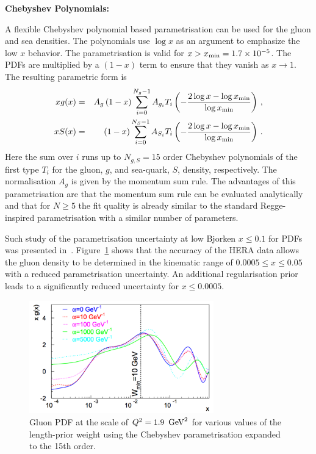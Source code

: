 \begin{description}
\item \bf {Chebyshev Polynomials:} \rm

A flexible Chebyshev polynomial based parametrisation can be used for the gluon and sea densities. The polynomials
use $\log x$ as an argument to emphasize the low $x$ behavior. 
The parametrisation is valid for $x>x_{\rm min} = 1.7\times 10^{-5}$. The PDFs are multiplied
by a $(1-x)$ term to ensure that they vanish as $x\to 1$. The resulting parametric form is 
\begin{eqnarray}
x g(x) &=& A_g \left(1-x\right) \sum_{i=0}^{N_g-1} A_{g_i} T_i \left(-\frac{\textstyle 2\log x - \log x_{\rm min} } {\textstyle \log x_{\rm min} } \right)\,, \label{eq:glu} \\
x S(x) &=& \left(1-x\right) \sum_{i=0}^{N_S-1} A_{S_i} T_i \left(-\frac{\textstyle 2\log x - \log x_{\rm min} } {\textstyle \log x_{\rm min} } \right)\,. \label{eq:sea} 
\end{eqnarray}
Here the sum over $i$ runs up to $N_{g,S}=15$ order Chebyshev polynomials of the first type $T_i$ for
the gluon, $g$, and sea-quark, $S$, density, respectively. 
The normalisation $A_g$ is given by the momentum sum rule.
%
The advantages of this parametrisation are that the momentum sum rule can be evaluated analytically 
and that for $N \ge 5$ the fit quality is already similar
to the standard Regge-inspired parametrisation with a similar number of parameters.

Such study of the parametrisation uncertainty at low Bjorken $x \le 0.1$ for PDFs was presented 
in~\cite{Chebyshev}. Figure~\ref{fig:cheb} shows that the accuracy of 
the HERA data allows the gluon density to be  determined in the kinematic range of $0.0005 \le x \le 0.05$ 
with a reduced parametrisation uncertainty. An additional regularisation prior leads to a 
significantly reduced uncertainty for $x \le 0.0005$.
\begin{figure}[!ht]
 \centering
  \includegraphics[width=8cm]{cheb.pdf}
 \caption{Gluon PDF at the scale of $Q^2=1.9 \  \,\text{Ge\hspace{-.08em}V}^2$ for various values of the length-prior 
          weight using the Chebyshev parametrisation expanded to the 15th order.}
 \label{fig:cheb}
\end{figure}


\end{description}
